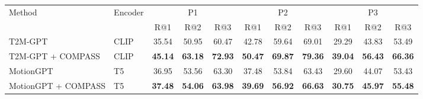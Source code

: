 \begin{tabular*}{\textwidth}{@{\extracolsep{\fill}}ll*{9}{c}@{}}
\toprule
Method & Encoder & \multicolumn{3}{c}{P1} & \multicolumn{3}{c}{P2} & \multicolumn{3}{c}{P3} \\
\cmidrule(lr){3-5}\cmidrule(lr){6-8}\cmidrule(lr){9-11}
& & R@1 & R@2 & R@3 & R@1 & R@2 & R@3 & R@1 & R@2 & R@3 \\
\midrule
T2M-GPT & CLIP & 35.54 & 50.95 & 60.47 & 42.78 & 59.64 & 69.01 & 29.29 & 43.83 & 53.49 \\
T2M-GPT + COMPASS & CLIP & \textbf{45.14} & \textbf{63.18} & \textbf{72.93} & \textbf{50.47} & \textbf{69.87} & \textbf{79.36} & \textbf{39.04} & \textbf{56.43} & \textbf{66.36} \\
\midrule
MotionGPT & T5 & 36.95 & 53.56 & 63.30 & 37.48 & 53.84 & 63.43 & 29.60 & 44.07 & 53.43 \\
MotionGPT + COMPASS & T5 & \textbf{37.48} & \textbf{54.06} & \textbf{63.98} & \textbf{39.69} & \textbf{56.92} & \textbf{66.63} & \textbf{30.75} & \textbf{45.97} & \textbf{55.48} \\
\bottomrule
\end{tabular*}
